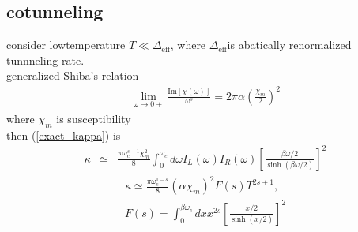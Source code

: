 \subsection{cotunneling}
consider lowtemperature $T\ll\mathit{\Delta}_{\mathrm{eff}}$, where $\mathit{\Delta}_{\mathrm{eff}}$is  abatically renormalized tunnneling rate.\\
generalized Shiba's relation
\begin{eqnarray}
	 \lim_{\omega \to 0+} \frac{\mathrm{Im}[\chi(\omega)]}{\omega^{s}}=2\pi\alpha\left(\frac{\chi_m}{2}\right)^{2}
\end{eqnarray}
where $\chi_m$ is susceptibility\\
then (\ref{exact_kappa}) is 
\begin{eqnarray}
	\kappa&\simeq& \frac{\pi\omega_c^{s-1}\chi_m^2}{8}\int_{0}^{\omega_{c}}d\omega  I_L(\omega)I_R (\omega)\left[\frac{\beta\omega/2}{\sinh{(\beta\omega/2)}}\right]^{2}
\end{eqnarray}
\begin{eqnarray}
	\kappa\simeq \frac{\pi\omega_c^{1-s}}{8}\left( \alpha \chi_m \right)^2 F(s)T^{2s+1}
	\label{cond_lowtemp},\\
	F (s)=\int_{0}^{\beta\omega_{c}}dx  x^{2s}\left[\frac{x/2}{\sinh({x/2})}\right]^{2}
\end{eqnarray}
